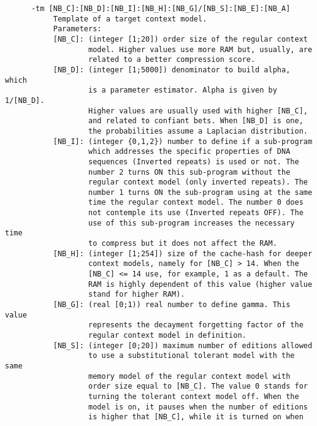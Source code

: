 \begin{lstlisting}
      -tm [NB_C]:[NB_D]:[NB_I]:[NB_H]:[NB_G]/[NB_S]:[NB_E]:[NB_A]       
           Template of a target context model.                          
           Parameters:                                                  
           [NB_C]: (integer [1;20]) order size of the regular context   
                   model. Higher values use more RAM but, usually, are  
                   related to a better compression score.               
           [NB_D]: (integer [1;5000]) denominator to build alpha, which 
                   is a parameter estimator. Alpha is given by 1/[NB_D].
                   Higher values are usually used with higher [NB_C],   
                   and related to confiant bets. When [NB_D] is one,    
                   the probabilities assume a Laplacian distribution.   
           [NB_I]: (integer {0,1,2}) number to define if a sub-program  
                   which addresses the specific properties of DNA       
                   sequences (Inverted repeats) is used or not. The     
                   number 2 turns ON this sub-program without the       
                   regular context model (only inverted repeats). The   
                   number 1 turns ON the sub-program using at the same  
                   time the regular context model. The number 0 does    
                   not contemple its use (Inverted repeats OFF). The    
                   use of this sub-program increases the necessary time 
                   to compress but it does not affect the RAM.          
           [NB_H]: (integer [1;254]) size of the cache-hash for deeper  
                   context models, namely for [NB_C] > 14. When the     
                   [NB_C] <= 14 use, for example, 1 as a default. The   
                   RAM is highly dependent of this value (higher value  
                   stand for higher RAM).                               
           [NB_G]: (real [0;1)) real number to define gamma. This value 
                   represents the decayment forgetting factor of the    
                   regular context model in definition.                 
           [NB_S]: (integer [0;20]) maximum number of editions allowed  
                   to use a substitutional tolerant model with the same 
                   memory model of the regular context model with       
                   order size equal to [NB_C]. The value 0 stands for   
                   turning the tolerant context model off. When the     
                   model is on, it pauses when the number of editions   
                   is higher that [NB_C], while it is turned on when    

\end{lstlisting}

